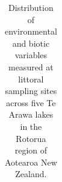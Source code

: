 \documentclass[
  letterpaper,
  DIV=11,
  numbers=noendperiod]{scrartcl}
\begin{document}
{

\begin{longtable}[]{@{}
  >{\raggedright\arraybackslash}p{}
  >{\raggedright\arraybackslash}p{}
  >{\raggedright\arraybackslash}p{}
  >{\raggedleft\arraybackslash}p{}
  >{\raggedleft\arraybackslash}p{}
  >{\raggedleft\arraybackslash}p{}
  >{\raggedleft\arraybackslash}p{}
  >{\raggedleft\arraybackslash}p{}
  >{\raggedleft\arraybackslash}p{}
  >{\raggedleft\arraybackslash}p{}@{}}

\caption{\label{tbl-env-fish-summary-ms}Distribution of environmental
and biotic variables measured at littoral sampling sites across five Te
Arawa lakes in the Rotorua region of Aotearoa New Zealand.}

\tabularnewline


\end{longtable}}
\end{document}

